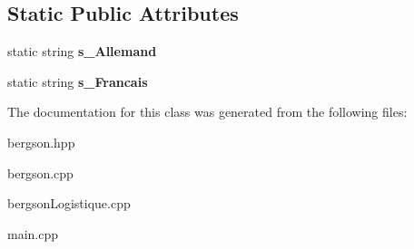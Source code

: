 \subsection*{Static Public Attributes}
\begin{DoxyCompactItemize}
\item 
\mbox{\label{classbergson_aff99dc406a8877cabb93405785845697}} 
static string {\bfseries s\+\_\+\+Allemand}
\item 
\mbox{\label{classbergson_a246f8e1bbc5adb5a4dd7e01a5b21ae77}} 
static string {\bfseries s\+\_\+\+Francais}
\end{DoxyCompactItemize}


The documentation for this class was generated from the following files\+:\begin{DoxyCompactItemize}
\item 
bergson.\+hpp\item 
bergson.\+cpp\item 
bergson\+Logistique.\+cpp\item 
main.\+cpp\end{DoxyCompactItemize}
